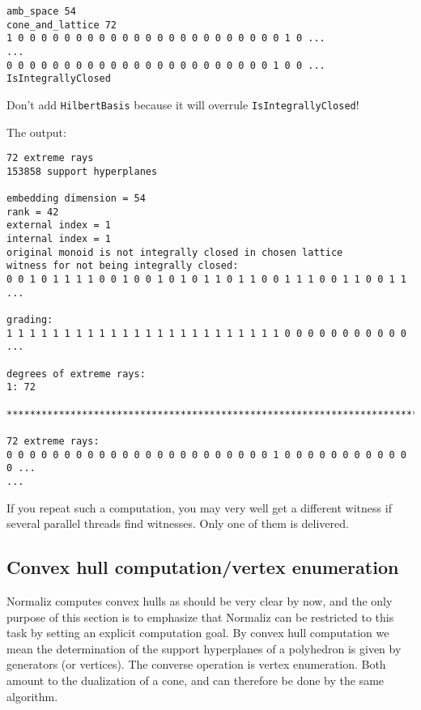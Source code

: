 \documentclass[12pt,a4paper]{scrartcl}
\theoremstyle{definition}
\begin{document}
\begin{Verbatim}
amb_space 54
cone_and_lattice 72
1 0 0 0 0 0 0 0 0 0 0 0 0 0 0 0 0 0 0 0 0 0 0 0 1 0 ...
...
0 0 0 0 0 0 0 0 0 0 0 0 0 0 0 0 0 0 0 0 0 0 0 1 0 0 ...
IsIntegrallyClosed
\end{Verbatim}
Don't add \verb|HilbertBasis| because it will overrule \verb|IsIntegrallyClosed|!

The output:
\begin{Verbatim}
72 extreme rays
153858 support hyperplanes

embedding dimension = 54
rank = 42
external index = 1
internal index = 1
original monoid is not integrally closed in chosen lattice
witness for not being integrally closed:
0 0 1 0 1 1 1 1 0 0 1 0 0 1 0 1 0 1 1 0 1 1 0 0 1 1 1 0 0 1 1 0 0 1 1 ...

grading:
1 1 1 1 1 1 1 1 1 1 1 1 1 1 1 1 1 1 1 1 1 1 1 1 0 0 0 0 0 0 0 0 0 0 0 ...

degrees of extreme rays:
1: 72  

***********************************************************************

72 extreme rays:
0 0 0 0 0 0 0 0 0 0 0 0 0 0 0 0 0 0 0 0 0 0 0 1 0 0 0 0 0 0 0 0 0 0 0 0 ...
...
\end{Verbatim}

If you repeat such a computation, you may very well get a different witness if several parallel threads find witnesses. Only one of them is delivered.

\subsection{Convex hull computation/vertex enumeration}

Normaliz computes convex hulls as should be very clear by now, and the only purpose of this section is to emphasize that Normaliz can be restricted to this task by setting an explicit computation goal. By convex hull computation we mean the determination of the support hyperplanes of a polyhedron is given by generators (or vertices). The converse operation is vertex enumeration. Both amount to the dualization of a cone, and can therefore be done by the same algorithm.
\end{document}

